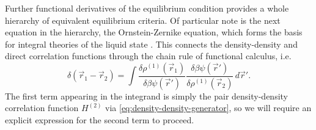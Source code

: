 Further functional derivatives of the equilibrium condition provides a whole hierarchy of equivalent equilibrium criteria.
Of particular note is the next equation in the hierarchy, the Ornstein-Zernike equation, which forms the basis for integral theories of the liquid state%
.
This connects the density-density and direct correlation functions through the chain rule of functional calculus, i.e.\
\begin{equation}\label{eq:oz-chain-rule}
  \delta(\vec{r}_1 - \vec{r}_2) =
  \int
  \frac{\delta \rho^{(1)}(\vec{r}_1)}{\delta \beta\psi(\vec{r}')}
  \frac{\delta \beta\psi(\vec{r}')}{\delta \rho^{(1)}(\vec{r}_2)}
  \, d\vec{r}'.
\end{equation}
The first term appearing in the integrand is simply the pair density-density correlation function $H^{(2)}$ via \eqref{eq:density-density-generator},
so we will require an explicit expression for the second term to proceed.

